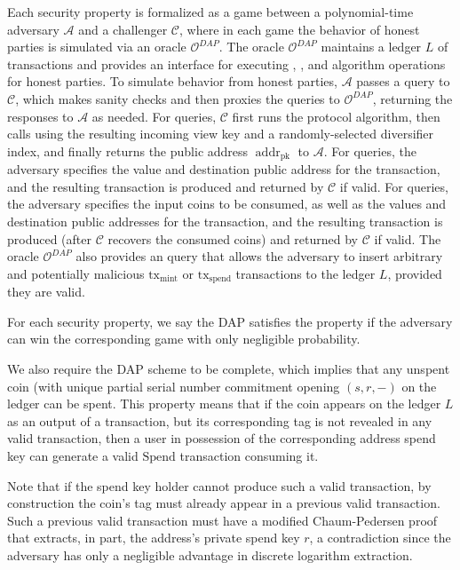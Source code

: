 \documentclass{llncs}
\newcommand{\addr}{\operatorname{addr}}
\begin{document}
Each security property is formalized as a game between a polynomial-time adversary $\mathcal{A}$ and a challenger $\mathcal{C}$, where in each game the behavior of honest parties is simulated via an oracle $\mathcal{O}^{DAP}$.
The oracle $\mathcal{O}^{DAP}$ maintains a ledger $L$ of transactions and provides an interface for executing , , and  algorithm operations for honest parties.
To simulate behavior from honest parties, $\mathcal{A}$ passes a query to $\mathcal{C}$, which makes sanity checks and then proxies the queries to $\mathcal{O}^{DAP}$, returning the responses to $\mathcal{A}$ as needed.
For  queries, $\mathcal{C}$ first runs the  protocol algorithm, then calls  using the resulting incoming view key and a randomly-selected diversifier index, and finally returns the public address $\addr_{\text{pk}}$ to $\mathcal{A}$.
For  queries, the adversary specifies the value and destination public address for the transaction, and the resulting transaction is produced and returned by $\mathcal{C}$ if valid.
For  queries, the adversary specifies the input coins to be consumed, as well as the values and destination public addresses for the transaction, and the resulting transaction is produced (after $\mathcal{C}$ recovers the consumed coins) and returned by $\mathcal{C}$ if valid.
The oracle $\mathcal{O}^{DAP}$ also provides an  query that allows the adversary to insert arbitrary and potentially malicious $\text{tx}_{\text{mint}}$ or $\text{tx}_{\text{spend}}$ transactions to the ledger $L$, provided they are valid.

For each security property, we say the DAP satisfies the property if the adversary can win the corresponding game with only negligible probability.

\begin{remark}
We also require the DAP scheme to be complete, which implies that any unspent coin (with unique partial serial number commitment opening $(s,r,-)$ on the ledger can be spent.
This property means that if the coin appears on the ledger $L$ as an output of a transaction, but its corresponding tag is not revealed in any valid transaction, then a user in possession of the corresponding address spend key can generate a valid $\text{Spend}$ transaction consuming it.

Note that if the spend key holder cannot produce such a valid transaction, by construction the coin's tag must already appear in a previous valid transaction.
Such a previous valid transaction must have a modified Chaum-Pedersen proof that extracts, in part, the address's private spend key $r$, a contradiction since the adversary has only a negligible advantage in discrete logarithm extraction.
\end{remark}
\end{document}
